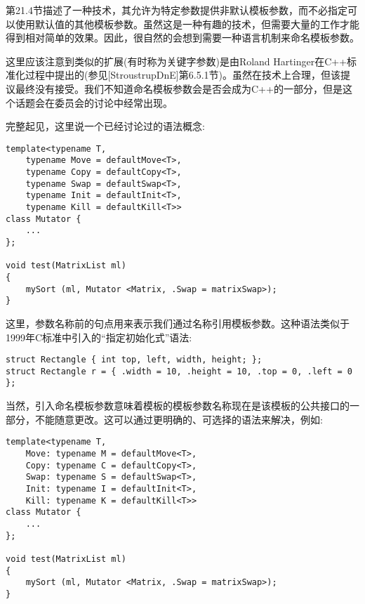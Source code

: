 第21.4节描述了一种技术，其允许为特定参数提供非默认模板参数，而不必指定可以使用默认值的其他模板参数。虽然这是一种有趣的技术，但需要大量的工作才能得到相对简单的效果。因此，很自然的会想到需要一种语言机制来命名模板参数。

这里应该注意到类似的扩展(有时称为关键字参数)是由Roland Hartinger在C++标准化过程中提出的(参见[StroustrupDnE]第6.5.1节)。虽然在技术上合理，但该提议最终没有接受。我们不知道命名模板参数会是否会成为C++的一部分，但是这个话题会在委员会的讨论中经常出现。

完整起见，这里说一个已经讨论过的语法概念:

\begin{lstlisting}[style=styleCXX]
template<typename T,
	typename Move = defaultMove<T>,
	typename Copy = defaultCopy<T>,
	typename Swap = defaultSwap<T>,
	typename Init = defaultInit<T>,
	typename Kill = defaultKill<T>>
class Mutator {
	...
};

void test(MatrixList ml)
{
	mySort (ml, Mutator <Matrix, .Swap = matrixSwap>);
}
\end{lstlisting}

这里，参数名称前的句点用来表示我们通过名称引用模板参数。这种语法类似于1999年C标准中引入的“指定初始化式”语法:

\begin{lstlisting}[style=styleCXX]
struct Rectangle { int top, left, width, height; };
struct Rectangle r = { .width = 10, .height = 10, .top = 0, .left = 0 };
\end{lstlisting}

当然，引入命名模板参数意味着模板的模板参数名称现在是该模板的公共接口的一部分，不能随意更改。这可以通过更明确的、可选择的语法来解决，例如:

\begin{lstlisting}[style=styleCXX]
template<typename T,
	Move: typename M = defaultMove<T>,
	Copy: typename C = defaultCopy<T>,
	Swap: typename S = defaultSwap<T>,
	Init: typename I = defaultInit<T>,
	Kill: typename K = defaultKill<T>>
class Mutator {
	...
};

void test(MatrixList ml)
{
	mySort (ml, Mutator <Matrix, .Swap = matrixSwap>);
}
\end{lstlisting}









































